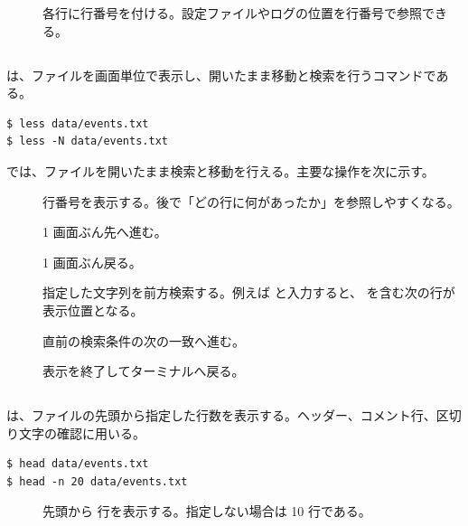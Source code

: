 \begin{description}
\item[] 各行に行番号を付ける。設定ファイルやログの位置を行番号で参照できる。
\end{description}

\subsection{}

 は、ファイルを画面単位で表示し、開いたまま移動と検索を行うコマンドである。

\begin{lstlisting}[numbers=none, xleftmargin=2\zw]
$ less data/events.txt
$ less -N data/events.txt
\end{lstlisting}

 では、ファイルを開いたまま検索と移動を行える。主要な操作を次に示す。

\begin{description}
\item[] 行番号を表示する。後で「どの行に何があったか」を参照しやすくなる。
\item[] 1 画面ぶん先へ進む。
\item[] 1 画面ぶん戻る。
\item[] 指定した文字列を前方検索する。例えば  と入力すると、 を含む次の行が表示位置となる。
\item[] 直前の検索条件の次の一致へ進む。
\item[] 表示を終了してターミナルへ戻る。
\end{description}

\subsection{}

 は、ファイルの先頭から指定した行数を表示する。ヘッダー、コメント行、区切り文字の確認に用いる。

\begin{lstlisting}[numbers=none, xleftmargin=2\zw]
$ head data/events.txt
$ head -n 20 data/events.txt
\end{lstlisting}

\begin{description}
\item[] 先頭から  行を表示する。指定しない場合は 10 行である。
\end{description}

